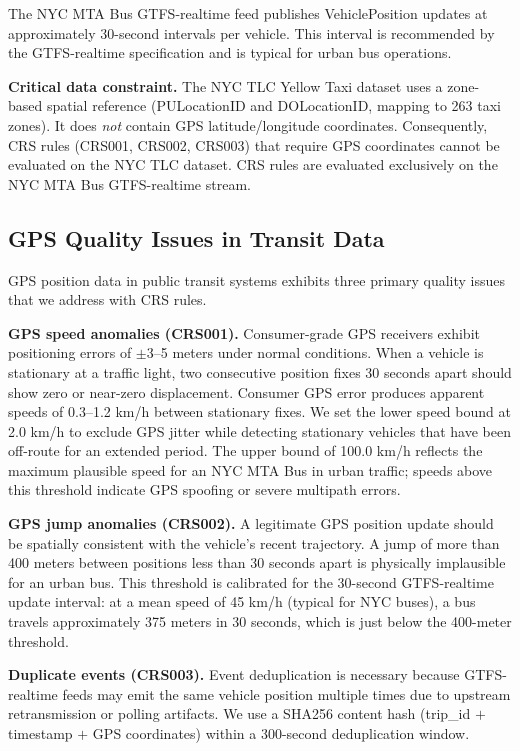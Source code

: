 The NYC MTA Bus GTFS-realtime feed publishes VehiclePosition updates at
approximately 30-second intervals per vehicle. This interval is recommended
by the GTFS-realtime specification \citep{gtfsrt_spec} and is typical for
urban bus operations.

\textbf{Critical data constraint.} The NYC TLC Yellow Taxi dataset uses
a zone-based spatial reference (PULocationID and DOLocationID, mapping to
263 taxi zones). It does \textit{not} contain GPS latitude/longitude
coordinates. Consequently, CRS rules (CRS001, CRS002, CRS003) that require
GPS coordinates cannot be evaluated on the NYC TLC dataset. CRS rules are
evaluated exclusively on the NYC MTA Bus GTFS-realtime stream.

\subsection{GPS Quality Issues in Transit Data}

GPS position data in public transit systems exhibits three primary quality
issues that we address with CRS rules.

\textbf{GPS speed anomalies (CRS001).} Consumer-grade GPS receivers exhibit
positioning errors of $\pm$3--5 meters under normal conditions. When a
vehicle is stationary at a traffic light, two consecutive position fixes
30 seconds apart should show zero or near-zero displacement. Consumer GPS
error produces apparent speeds of 0.3--1.2 km/h between stationary fixes.
We set the lower speed bound at 2.0 km/h to exclude GPS jitter while
detecting stationary vehicles that have been off-route for an extended
period. The upper bound of 100.0 km/h reflects the maximum plausible speed
for an NYC MTA Bus in urban traffic; speeds above this threshold indicate
GPS spoofing or severe multipath errors. \citep{gtfsrt_spec}

\textbf{GPS jump anomalies (CRS002).} A legitimate GPS position update should
be spatially consistent with the vehicle's recent trajectory. A jump of more
than 400 meters between positions less than 30 seconds apart is physically
implausible for an urban bus. This threshold is calibrated for the 30-second
GTFS-realtime update interval: at a mean speed of 45 km/h (typical for NYC
buses), a bus travels approximately 375 meters in 30 seconds, which is
just below the 400-meter threshold.

\textbf{Duplicate events (CRS003).} Event deduplication is necessary because
GTFS-realtime feeds may emit the same vehicle position multiple times due
to upstream retransmission or polling artifacts. We use a SHA256 content
hash (trip\_id $+$ timestamp $+$ GPS coordinates) within a 300-second
deduplication window.

